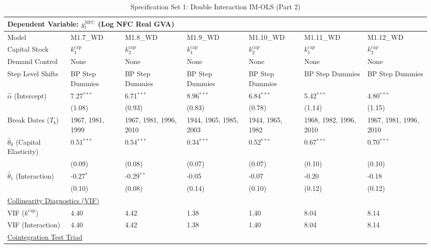 \begin{table}[H]
\centering
\caption{Specification Set 1: Double Interaction IM-OLS (Part 2)}
\label{tab:paper_spec_set_1_2}
\scriptsize
\begin{tabular}{p{3.8cm}p{1.35cm}p{1.35cm}p{1.35cm}p{1.35cm}p{1.35cm}p{1.35cm}}
\toprule
\multicolumn{7}{l}{\textbf{Dependent Variable: $y_t^{\text{NFC}}$ (Log NFC Real GVA)}} \\
\midrule
Model & M1.7\_WD & M1.8\_WD & M1.9\_WD & M1.10\_WD & M1.11\_WD & M1.12\_WD  \\
Capital Stock & $k^{\text{cap}}_1$ & $k^{\text{cap}}_2$ & $k^{\text{cap}}_1$ & $k^{\text{cap}}_2$ & $k^{\text{cap}}_1$ & $k^{\text{cap}}_2$  \\
Demand Control & None & None & None & None & None & None  \\
Step Level Shifts & BP Step Dummies & BP Step Dummies & BP Step Dummies & BP Step Dummies & BP Step Dummies & BP Step Dummies  \\
\midrule
$\hat{\alpha}$ (Intercept)  & 7.27$^{***}$ & 6.71$^{***}$ & 8.96$^{***}$ & 6.84$^{***}$ & 5.42$^{***}$ & 4.80$^{***}$  \\
 & {\scriptsize (1.08)} & {\scriptsize (0.93)} & {\scriptsize (0.83)} & {\scriptsize (0.78)} & {\scriptsize (1.14)} & {\scriptsize (1.15)}  \\
Break Dates ($T_b$) & 1967, 1981, 1999 & 1967, 1981, 1996, 2010 & 1944, 1965, 1985, 2003 & 1944, 1965, 1982 & 1968, 1982, 1996, 2010 & 1967, 1981, 1996, 2010  \\
[1ex]
$\hat{\theta}_0$ (Capital Elasticity)  & 0.51$^{***}$ & 0.54$^{***}$ & 0.34$^{***}$ & 0.52$^{***}$ & 0.67$^{***}$ & 0.70$^{***}$  \\
 & {\scriptsize (0.09)} & {\scriptsize (0.08)} & {\scriptsize (0.07)} & {\scriptsize (0.07)} & {\scriptsize (0.10)} & {\scriptsize (0.10)}  \\
$\hat{\theta}_1$ (Interaction)  & -0.27$^{*}$ & -0.29$^{**}$ & -0.05 & -0.07 & -0.20 & -0.18  \\
 & {\scriptsize (0.10)} & {\scriptsize (0.08)} & {\scriptsize (0.14)} & {\scriptsize (0.10)} & {\scriptsize (0.12)} & {\scriptsize (0.12)}  \\
\midrule
\multicolumn{7}{l}{\underline{Collinearity Diagnostics (VIF)}} \\
VIF ($k^{\text{cap}}$) & 4.40 & 4.42 & 1.38 & 1.40 & 8.04 & 8.14  \\
VIF (Interaction) & 4.40 & 4.42 & 1.38 & 1.40 & 8.04 & 8.14  \\
\midrule
\multicolumn{7}{l}{\underline{Cointegration Test Triad}} \\

\end{tabular}
\end{table}

